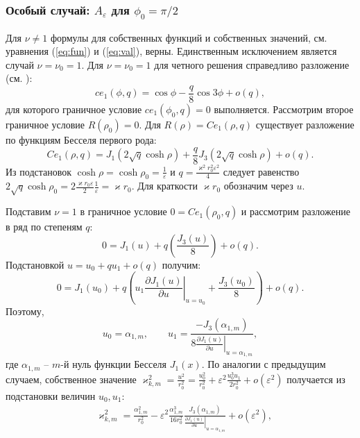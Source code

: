 \subsubsection{Особый случай: $A_\varepsilon$ для $\phi_0=\pi/2$}\label{sec:ch2/sec2/sub2/sub1}


Для $\nu\ne 1$ формулы для собственных функций и собственных значений, см. уравнения (\ref{eq:fun}) и (\ref{eq:val}), верны. Единственным исключением является случай  $\nu=\nu_0=1$.
Для $\nu=\nu_0=1$ для четного решения справедливо разложение (см. \cite[Subsect.~20.2.27]{wref2}):
\begin{equation*}
ce_1(\phi, q) = 	\cos{\phi}  - \frac{q}{8} \cos{3\phi} + o(q),
 \end{equation*}
для которого граничное условие  $ce_1(\phi_0, q)=0$ выполняется. 
Рассмотрим второе граничное условие $R(\rho_0) = 0$.
Для $R(\rho) = Ce_1(\rho, q)$ существует разложение по функциям Бесселя первого рода:
\begin{equation*}
Ce_1(\rho, q) = J_1(2\sqrt{q} \cosh{\rho}) + \frac{q}{8} J_3(2\sqrt{q}\cosh{\rho}) + o(q).
\end{equation*}
Из подстановок $\cosh\rho = \cosh\rho_0 =  \frac{1}{\varepsilon}$ и $q = \frac{\varkappa^2 r_0^2 \varepsilon^2}{4}$ следует равенство
$2\sqrt{q} \cosh{\rho_0} = 2 \frac{\varkappa r_0 \varepsilon}{2} \frac{1}{\varepsilon} = \varkappa r_0$. Для краткости $\varkappa r_0$ обозначим через $u$. 

Подставим $\nu = 1$ в граничное условие $0 = Ce_1(\rho_0, q)$ и рассмотрим разложение в ряд по степеням   $q$:
\begin{equation*}
    0 = J_1(u) + q \left( \frac{J_3(u)}{8} \right) + o(q).
\end{equation*}
Подстановкой  $u = u_0 + q u_1 + o(q)$ получим:
\begin{equation*}
    0 = 
    J_1(u_0) + q \left( 
    u_1 \left.\frac{\partial J_1 (u)}{\partial u}\right|_{u=u_0}
    + \frac{J_3(u_0)}{8}
    \right) + o(q).
\end{equation*}
Поэтому, 
\begin{equation*}
u_0 = \alpha_{1, m}, \qquad u_1 = 
\frac{ - J_3(\alpha_{1, m}) }{8\left.
\frac{\partial J_1 (u)}{\partial u}\right|_{u=\alpha_{1, m}}},
\end{equation*}
где $\alpha_{1, m}$ -- $m$-й нуль функции Бесселя  $J_1(x)$. По аналогии с предыдущим случаем,
собственное значение $\varkappa_{k, m}^2 = \frac{u^2}{r_0^2} = \frac{u_0^2}{r_0^2} + \varepsilon^2 \frac{u_0^3 u_1}{2r_0^2} + o(\varepsilon^2)$ получается из подстановки величин  $u_0, u_1$:
\begin{align}
   & \varkappa_{k, m}^2 = \frac{\alpha_{1, m}^2}{r_0^2} - \varepsilon^2 \frac{\alpha_{1, m}^3}{16r_0^2} 
    \frac{J_3(\alpha_{1, m})}{\left.\frac{\partial J_1 (u)}{\partial u}\right|_{u=\alpha_{1, m}}} 
    + o(\varepsilon^2), \label{eq:valS1}
    \end{align}



